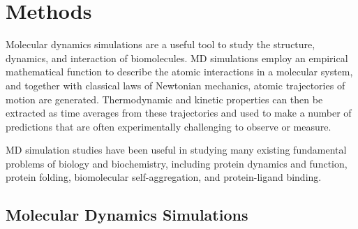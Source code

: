 \chapter{Methods}

\begin{outline}
\1 Molecular dynamics simulations are a useful tool to study the structure, dynamics, and interaction of biomolecules. MD simulations employ an empirical mathematical function to describe the atomic interactions in a molecular system, and together with classical laws of Newtonian mechanics, atomic trajectories of motion are generated. Thermodynamic and kinetic properties can then be extracted as time averages from these trajectories and used to make a number of predictions that are often experimentally challenging to observe or measure.

\1 MD simulation studies have been useful in studying many existing fundamental problems of biology and biochemistry, including protein dynamics and function, protein folding, biomolecular self-aggregation, and protein-ligand binding.
\end{outline}

\section{Molecular Dynamics Simulations} %



